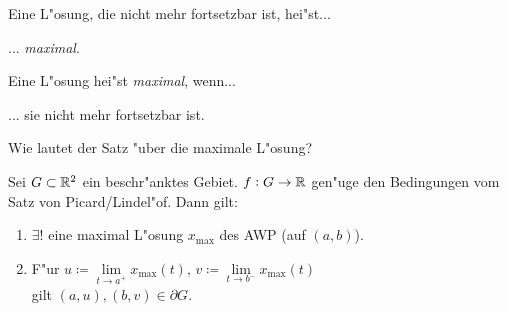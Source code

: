 \documentclass[9pt]{article}
\newcommand{\R}[1]{%
	\ifthenelse{\equal{#1}{}}
		{\mathbb{R}}
		{\mathbb{R}^{#1}}}%
\newenvironment{field}{}{\newpage}
\newif\ifnote
\newenvironment{note}{\notetrue}{\notefalse}
\newcommand{\localtag}{}
\newcommand{\globaltag}{}
\newcommand{\uuid}{}
\newcommand{\tags}[1]{
    \ifnote 
        \renewcommand{\localtag}{#1}
    \else
        \renewcommand{\globaltag}{#1}
    \fi 
    }
\newcommand{\xplain}[1]{\renewcommand{\uuid}{#1}}
\begin{document}
\begin{note}
	\xplain{UUID}
	\tags{definition, fortsetzung,, 3.5.3, 3.5.4}
	
	\begin{field}  %
		Eine L"osung, die nicht mehr fortsetzbar ist, hei"st...
	\end{field}
	
	\begin{field}  %
		... \textit{maximal}.
	\end{field}
		
	\begin{field}  %
		Eine L"osung hei"st \textit{maximal}, wenn...
	\end{field}
	
	\begin{field}  %
		... sie nicht mehr fortsetzbar ist.
	\end{field}
		
	\begin{field}  %
		Wie lautet der Satz "uber die maximale L"osung?
	\end{field}
	
	\begin{field}  %
		Sei $G \subset \R{2}$ ein beschr"anktes Gebiet. $f: G \rightarrow \R{}$ gen"uge den Bedingungen vom Satz von Picard/Lindel"of. Dann gilt:
		\begin{enumerate}
			\item $\exists!$ eine maximal L"osung $x_{\text{max}}$ des AWP (auf $(a,b)$).
			\item F"ur $u \coloneqq \lim\limits_{t\rightarrow a^+}x_{\text{max}}(t)$,
			$v\coloneqq \lim\limits_{t\rightarrow b^-}x_{\text{max}}(t)$ \\
			gilt $(a,u), (b,v) \in \partial G$.
		\end{enumerate}
	\end{field}
\end{note}
\end{document}
